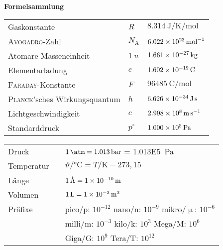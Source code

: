 \documentclass[./main.tex]{subfiles}
\begin{document}
{\centering\large\bfseries Formelsammlung\\}

\begin{formulabox}[Naturkonstanten]
  \begin{center}
  \renewcommand{\arraystretch}{1.4}
    \begin{tabular}{>{\raggedleft}p{} >{\centering}p{} p{}}
        Gaskonstante & $R$ & $\SI{8.314}{\joule\per\kelvin\per\mole}$\\
        \textsc{Avogadro}-Zahl & $N_\mathrm{A} $ & $ \SI{6.022E23}{\per\mole}$\\
        Atomare Masseneinheit & $\SI{1}{u} $ & $ \SI{1,661E-27}{\kilo\gram}$\\
        Elementarladung & $e $ & $ \SI{1,602E-19}{\coulomb}$\\
        \textsc{Faraday}-Konstante & $F $ & $ \SI{96485}{\coulomb\per\mole}$\\
        \textsc{Planck}'sches Wirkungsquantum & $h $ & $ \SI{6,626E-34}{\joule\second}$\\
        Lichtgeschwindigkeit & $c$ & $ \SI{2,998E8}{\meter\per\second}$\\
        Standarddruck & $p^\circ$ & $\SI{1,000E5}{\pascal}$
    \end{tabular}
  \end{center}
\end{formulabox}

\begin{formulabox}[Einheiten]
  \begin{center}
  \renewcommand{\arraystretch}{1.4}
    \begin{tabular}{>{\raggedleft\arraybackslash}p{} p{}p{}}
        Druck & & $\SI{1}{\atm} = \SI{1.013}{\bar}$ = \SI{1.013E5}{\pascal}\\
        Temperatur & & $\vartheta / \si{\celsius} = T/\si{\kelvin} - 273,15$ \\
        L\"ange & & $\SI{1}{\angstrom}=\SI{1E-10}{\meter}$ \\
        Volumen & & $\SI{1}{\liter}=\SI{1E-3}{\cubic\meter}$ \\
        Pr\"afixe & & pico/p: $10^{-12}$\hspace{0.74cm} nano/n: $10^{-9}$\hspace{0.49cm} mikro/$\upmu$: $10^{-6}$ \\
        & &milli/m: $10^{-3}$\hspace{0.7cm} kilo/k: $10^{3}$\hspace{0.95cm} Mega/M: $10^{6}$\\
        & &Giga/G: $10^{9}$\hspace{0.95cm} Tera/T: $10^{12}$\\
    \end{tabular}
  \end{center}
\end{formulabox}
\end{document}
